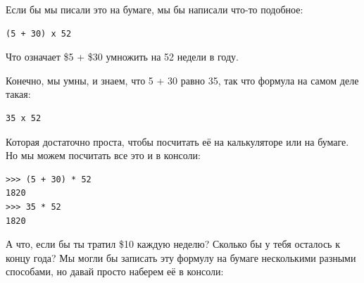 \begin{figure}[t]
\begin{center}
\end{center}
\end{figure}

Если бы мы писали это на бумаге, мы бы написали что-то подобное:
\begin{verbatim}
(5 + 30) x 52
\end{verbatim}

Что означает \$5 + \$30 умножить на 52 недели в году.  \begin{samepage}Конечно, мы умны, и знаем, что 5 + 30 равно 35, так что формула на самом деле такая:

\begin{verbatim}
35 x 52
\end{verbatim}
\end{samepage}

Которая достаточно проста, чтобы посчитать её на калькуляторе или на бумаге.  Но мы можем посчитать все это и в консоли:

\begin{listing}
\begin{verbatim}
>>> (5 + 30) * 52
1820
>>> 35 * 52
1820
\end{verbatim}
\end{listing}

А что, если бы ты тратил \$10 каждую неделю? Сколько бы у тебя осталось к концу года? Мы могли бы записать эту формулу на бумаге несколькими разными способами, но давай просто наберем её в консоли:

